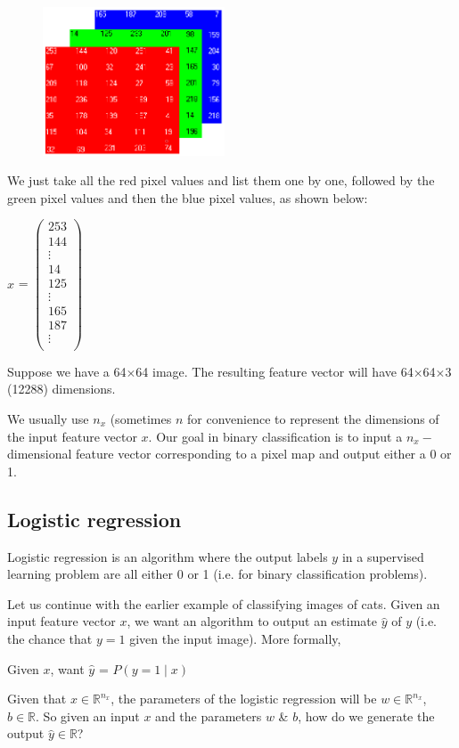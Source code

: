 \documentclass{article}[a4paper,12pt]
\theoremstyle{definition}
\begin{document}
\begin{figure}
\centering \includegraphics[width=0.48\textwidth]{rgb_matrices.png}
\end{figure}

We just take all the red pixel values and list them one by one, followed by the green pixel values and then the blue pixel values, as shown below:
\begin{center}
$x$ =
$\begin{pmatrix}
	253\\
	144\\
	\vdots\\
	14\\
	125\\
	\vdots\\
	165\\
	187\\
	\vdots\\
\end{pmatrix}$
\end{center}
Suppose we have a 64$\times$64 image. The resulting feature vector will have 64$\times$64$\times$3 (12288) dimensions.
\vspace{-6pt}

We usually use $n_x$ (sometimes $n$ for convenience to represent the dimensions of the input feature vector $x$. Our goal in binary classification is to input a $n_x-$dimensional feature vector corresponding to a pixel map and output either a 0 or 1. 
\subsection{Logistic regression}
Logistic regression is an algorithm where the output labels $y$ in a supervised learning problem are all either 0 or 1 (i.e. for binary classification problems).
\vspace{6pt}

Let us continue with the earlier example of classifying images of cats. Given an input feature vector $x$, we want an algorithm to output an estimate $\hat{y}$ of $y$ (i.e. the chance that $y=1$ given the input image). More formally, 
\begin{center}
Given $x$, want $\hat{y}$ = $P(y=1\mid x)$
\end{center}
Given that $x\in\mathbb{R}^{n_x}$, the parameters of the logistic regression will be $w\in\mathbb{R}^{n_x}$, $b\in\mathbb{R}$. So given an input $x$ and the parameters $w$ \& $b$, how do we generate the output $\hat{y}\in\mathbb{R}$? 
\vspace{6pt}
\end{document}
